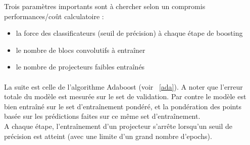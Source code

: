 \documentclass[11 pt]{article}
\begin{document}
Trois paramètres importants sont à chercher selon un compromis performances/coût calculatoire :\\ \medskip
\begin{itemize}
  \item la force des classificateurs (seuil de précision) à chaque étape de boosting
  \item le nombre de blocs convolutifs à entraîner
  \item le nombre de projecteurs faibles entraînés
\end{itemize}

\paragraph{}La suite est celle de l’algorithme Adaboost (voir ~\ref{ada}). A noter que l’erreur totale du modèle est mesurée sur le set de validation. Par contre le modèle est bien entraîné sur le set d’entraînement pondéré, et la pondération des points basée sur les prédictions faites sur ce même set d’entraînement.\\

A chaque étape, l’entraînement d’un projecteur s’arrête lorsqu’un seuil de précision est atteint (avec une limite d’un grand nombre d’epochs).

\pagebreak
\end{document}

